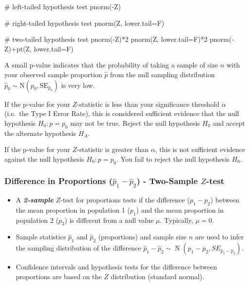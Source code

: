 \documentclass[
  letterpaper,
  DIV=11,
  numbers=noendperiod]{scrartcl}
\newenvironment{Shaded}{\begin{snugshade}}{\end{snugshade}}
\newcommand{\AttributeTok}[1]{\textcolor[rgb]{0.40,0.45,0.13}{#1}}
\newcommand{\CommentTok}[1]{\textcolor[rgb]{0.37,0.37,0.37}{#1}}
\newcommand{\DecValTok}[1]{\textcolor[rgb]{0.68,0.00,0.00}{#1}}
\newcommand{\FunctionTok}[1]{\textcolor[rgb]{0.28,0.35,0.67}{#1}}
\newcommand{\NormalTok}[1]{\textcolor[rgb]{0.00,0.23,0.31}{#1}}
\newcommand{\SpecialCharTok}[1]{\textcolor[rgb]{0.37,0.37,0.37}{#1}}
\begin{document}
\begin{Shaded}
\begin{Highlighting}[]
\CommentTok{\# left{-}tailed hypothesis test}
\FunctionTok{pnorm}\NormalTok{(}\SpecialCharTok{{-}}\NormalTok{Z)}

\CommentTok{\# right{-}tailed hypothesis test}
\FunctionTok{pnorm}\NormalTok{(Z, }\AttributeTok{lower.tail=}\NormalTok{F)}

\CommentTok{\# two{-}tailed hypothesis test}
\FunctionTok{pnorm}\NormalTok{(}\SpecialCharTok{{-}}\NormalTok{Z)}\SpecialCharTok{*}\DecValTok{2}
\FunctionTok{pnorm}\NormalTok{(Z, }\AttributeTok{lower.tail=}\NormalTok{F)}\SpecialCharTok{*}\DecValTok{2}
\FunctionTok{pnorm}\NormalTok{(}\SpecialCharTok{{-}}\NormalTok{Z)}\SpecialCharTok{+}\FunctionTok{pt}\NormalTok{(Z, }\AttributeTok{lower.tail=}\NormalTok{F)}
\end{Highlighting}
\end{Shaded}

A small p-value indicates that the probability of taking a sample of
size \(n\) with your observed sample proportion \(\hat{p}\) from the
null sampling distribution
\(\hat{p}_0 \sim \text{N}\left(p_0, \text{SE}_{\hat{p}_0}\right)\) is
very low.

If the p-value for your \(Z\)-statistic is less than your significance
threshold \(\alpha\) (i.e.~the Type I Error Rate), this is considered
sufficient evidence that the null hypothesis \(H_0 \colon p=p_0\) may
not be true. Reject the null hypothesis \(H_0\) and accept the alternate
hypothesis \(H_A\).

If the p-value for your \(Z\)-statistic is greater than \(\alpha\), this
is not sufficient evidence against the null hypothesis
\(H_0 \colon p=p_0\). You fail to reject the null hypothesis \(H_0\).

\subsubsection{\texorpdfstring{Difference in Proportions
(\(\hat{p}_1-\hat{p}_2\)) - Two-Sample
\(Z\)-test}{Difference in Proportions (\textbackslash hat\{p\}\_1-\textbackslash hat\{p\}\_2) - Two-Sample Z-test}}\label{difference-in-proportions-hatp_1-hatp_2---two-sample-z-test}

\begin{itemize}
\item
  A \textbf{\emph{2-sample}} \(Z\)-test for proportions tests if the
  difference (\(p_1-p_2\)) between the mean proportion in population 1
  (\(p_1\)) and the mean proportion in population 2 (\(p_2\)) is
  different from a null value \(\mu\). Typically, \(\mu=0\).
\item
  Sample statistics \(\hat{p}_1\) and \(\hat{p}_2\) (proportions) and
  sample size \(n\) are used to infer the sampling distribution of the
  difference
  \(\hat{p}_1-\hat{p}_2 \sim \operatorname{N}\left(p_1-p_2, SE_{\hat{p}_1-\hat{p}_2}\right)\).
\item
  Confidence intervals and hypothesis tests for the difference between
  proportions are based on the \(Z\) distribution (standard normal).
\end{itemize}
\end{document}
